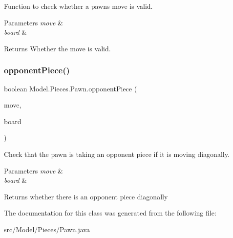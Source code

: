 Function to check whether a pawn\textquotesingle{}s move is valid. 
\begin{DoxyParams}{Parameters}
{\em move} & \\
\hline
{\em board} & \\
\hline
\end{DoxyParams}
\begin{DoxyReturn}{Returns}
Whether the move is valid. 
\end{DoxyReturn}
\hypertarget{class_model_1_1_pieces_1_1_pawn_a130ca7b5f609a5caf2e76e782efc30c4}{}\label{class_model_1_1_pieces_1_1_pawn_a130ca7b5f609a5caf2e76e782efc30c4} 
\subsubsection{\texorpdfstring{opponent\+Piece()}{opponentPiece()}}
{\footnotesize\ttfamily boolean Model.\+Pieces.\+Pawn.\+opponent\+Piece (\begin{DoxyParamCaption}\item[{\hyperlink{class_model_1_1_move}{Move}}]{move,  }\item[{\hyperlink{class_model_1_1_board}{Board}}]{board }\end{DoxyParamCaption})}

Check that the pawn is taking an opponent piece if it is moving diagonally. 
\begin{DoxyParams}{Parameters}
{\em move} & \\
\hline
{\em board} & \\
\hline
\end{DoxyParams}
\begin{DoxyReturn}{Returns}
whether there is an opponent piece diagonally 
\end{DoxyReturn}


The documentation for this class was generated from the following file\+:\begin{DoxyCompactItemize}
\item 
src/\+Model/\+Pieces/Pawn.\+java\end{DoxyCompactItemize}
